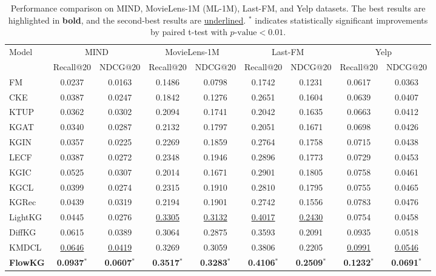 \setlength{\tabcolsep}{6pt}
\begin{table}[t]
	\small
	\centering
	\caption{Performance comparison on MIND, MovieLens-1M (ML-1M), Last-FM, and Yelp datasets. The best results are highlighted in \textbf{bold}, and the second-best results are \underline{underlined}. $^*$ indicates statistically significant improvements by paired t-test with $p\text{-value} < 0.01$.}
	\label{tab:overall_performance}
		\begin{tabular}{l|cc|cc|cc|cc}
			\toprule
			\multirow{2}{*}{Model} 
			& \multicolumn{2}{c|}{MIND} 
			& \multicolumn{2}{c|}{MovieLens-1M} 
			& \multicolumn{2}{c|}{Last-FM}
			& \multicolumn{2}{c}{Yelp} \\
			
			\cmidrule(lr){2-3} \cmidrule(lr){4-5} \cmidrule(lr){6-7} \cmidrule(lr){8-9}
			
			& Recall@20 & NDCG@20
			& Recall@20 & NDCG@20
			& Recall@20 & NDCG@20
			& Recall@20 & NDCG@20 \\
			\midrule
			
			FM
			& 0.0237 & 0.0163 & 0.1486 & 0.0798 & 0.1742 & 0.1231 & 0.0617 & 0.0363 \\
			CKE
			& 0.0387 & 0.0247 & 0.1842 & 0.1276 & 0.2651 & 0.1604 & 0.0639 & 0.0407 \\
			KTUP
			& 0.0362 & 0.0302 & 0.2094 & 0.1741 & 0.2042 & 0.1635 & 0.0663 & 0.0412 \\
			KGAT
			& 0.0340 & 0.0287 & 0.2132 & 0.1797 & 0.2051 & 0.1671 & 0.0698 & 0.0426 \\
			KGIN
			& 0.0357 & 0.0225 & 0.2269 & 0.1859 & 0.2764 & 0.1758 & 0.0715 & 0.0438 \\
			LECF
			& 0.0387 & 0.0272 & 0.2348 & 0.1946 & 0.2896 & 0.1773 & 0.0729 & 0.0453 \\
			KGIC
			& 0.0525 & 0.0307 & 0.2014 & 0.1671 & 0.2901 & 0.1805 & 0.0758 & 0.0461 \\
			KGCL
			& 0.0399 & 0.0274 & 0.2315 & 0.1910 & 0.2810 & 0.1795 & 0.0755 & 0.0465 \\
			KGRec
			& 0.0439 & 0.0319 & 0.2194 & 0.1901 & 0.2742 & 0.1556 & 0.0783 & 0.0476 \\
			LightKG
			&0.0445 & 0.0276 & \underline{0.3305} & \underline{0.3132} & \underline{0.4017} & \underline{0.2430} &0.0754 & 0.0458\\		
			DiffKG
			& 0.0615 & 0.0389 & 0.3064 & 0.2875 & 0.3593 & 0.2091 & 0.0935 & 0.0518 \\
			KMDCL
			& \underline{0.0646} & \underline{0.0419} & 0.3269 & 0.3059 & 0.3806 & 0.2205 & \underline{0.0991} & \underline{0.0546} \\
			
			\hline
			
			\rule{0pt}{2ex}\textbf{FlowKG} 
			& \textbf{0.0937}$^{*}$ & \textbf{0.0607}$^{*}$ 
			& \textbf{0.3517}$^{*}$ & \textbf{0.3283}$^{*}$ 
			& \textbf{0.4106}$^{*}$ & \textbf{0.2509}$^{*}$ 
			& \textbf{0.1232}$^{*}$ & \textbf{0.0691}$^{*}$ \\
			\bottomrule
		\end{tabular}
\end{table}

